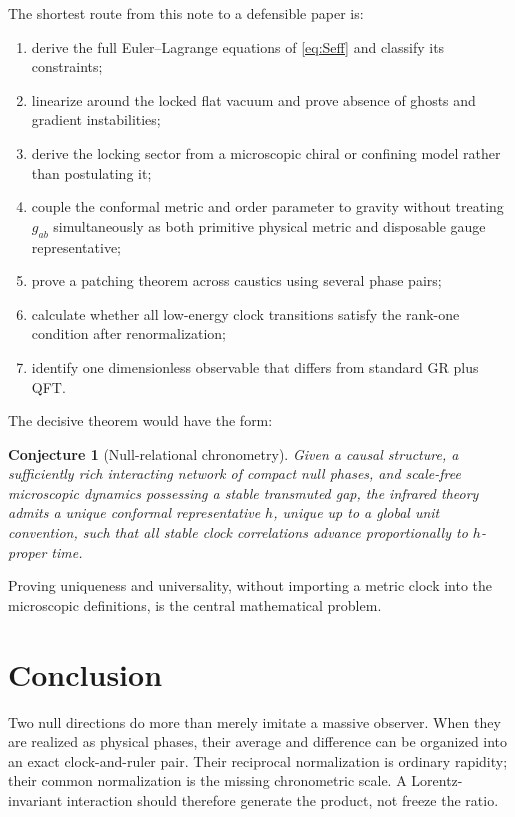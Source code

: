 \documentclass[11pt,a4paper]{article}
\newtheorem{conjecture}[definition]{Conjecture}
\begin{document}
The shortest route from this note to a defensible paper is:

\begin{enumerate}
  \item derive the full Euler--Lagrange equations of \eqref{eq:Seff} and classify its constraints;
  \item linearize around the locked flat vacuum and prove absence of ghosts and gradient instabilities;
  \item derive the locking sector from a microscopic chiral or confining model rather than postulating it;
  \item couple the conformal metric and order parameter to gravity without treating $g_{ab}$ simultaneously as both primitive physical metric and disposable gauge representative;
  \item prove a patching theorem across caustics using several phase pairs;
  \item calculate whether all low-energy clock transitions satisfy the rank-one condition after renormalization;
  \item identify one dimensionless observable that differs from standard GR plus QFT.
\end{enumerate}

The decisive theorem would have the form:

\begin{conjecture}[Null-relational chronometry]
Given a causal structure, a sufficiently rich interacting network of compact null phases, and scale-free microscopic dynamics possessing a stable transmuted gap, the infrared theory admits a unique conformal representative $h$, unique up to a global unit convention, such that all stable clock correlations advance proportionally to $h$-proper time.
\end{conjecture}

Proving uniqueness and universality, without importing a metric clock into the microscopic definitions, is the central mathematical problem.

\section{Conclusion}

Two null directions do more than merely imitate a massive observer. When they are realized as physical phases, their average and difference can be organized into an exact clock-and-ruler pair. Their reciprocal normalization is ordinary rapidity; their common normalization is the missing chronometric scale. A Lorentz-invariant interaction should therefore generate the product, not freeze the ratio.
\end{document}
